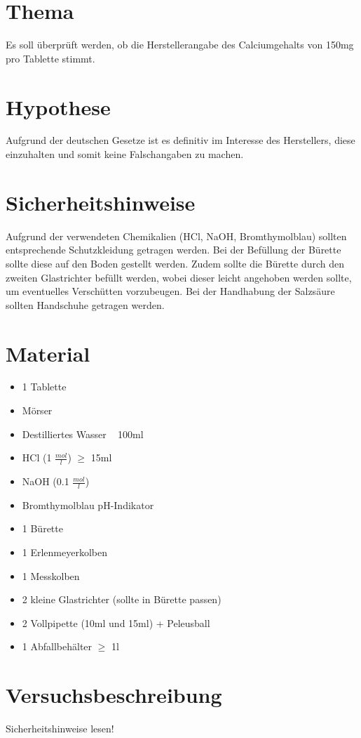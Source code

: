 \documentclass[8pt, letterpaper]{article}
\newcommand{\mpl}[1]{#1 \(\frac{mol}{l}\)}
\begin{document}
\section{Thema}
Es soll überprüft werden, ob die Herstellerangabe des Calciumgehalts von 150mg pro Tablette stimmt.

\section{Hypothese}
Aufgrund der deutschen Gesetze ist es definitiv im Interesse des Herstellers, diese einzuhalten und somit keine Falschangaben zu machen.

\section{Sicherheitshinweise}
Aufgrund der verwendeten Chemikalien (HCl, NaOH, Bromthymolblau) sollten entsprechende Schutzkleidung getragen werden.
Bei der Befüllung der Bürette sollte diese auf den Boden gestellt werden. Zudem sollte die Bürette durch den zweiten Glastrichter befüllt werden, wobei dieser leicht angehoben werden sollte, um eventuelles Verschütten vorzubeugen.
Bei der Handhabung der Salzsäure sollten Handschuhe getragen werden.

\section{Material}
\begin{itemize}
    \item 1 Tablette
    \item Mörser
    \item Destilliertes Wasser ~ 100ml
    \item HCl (\mpl{1}) \(\ge\) 15ml
    \item NaOH (\mpl{0.1})
    \item Bromthymolblau pH-Indikator
    \item 1 Bürette
    \item 1 Erlenmeyerkolben
    \item 1 Messkolben
    \item 2 kleine Glastrichter (sollte in Bürette passen)
    \item 2 Vollpipette (10ml und 15ml) + Peleusball
    \item 1 Abfallbehälter \(\ge\) 1l
\end{itemize}

\section{Versuchsbeschreibung}
Sicherheitshinweise lesen!
\end{document}
